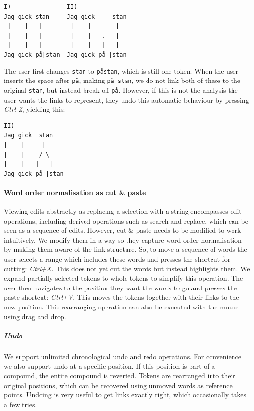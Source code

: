 \documentclass[10pt, a4paper]{article}
\newcommand{\dan}[1]{{\color{Fuchsia}{Dan: #1}}}
\begin{document}
\begin{verbatim}
I)                II)
Jag gick stan     Jag gick     stan
 |    |   |        |    |       |
 |    |   |        |    |   .   |
 |    |   |        |    |   |   |
Jag gick på|stan  Jag gick på |stan
\end{verbatim}
The user first changes \verb!stan! to \verb!påstan!, which is still one token.
When the user inserts the space after \verb!på!, making \verb!på stan!, we do
not link both of these to the original \verb!stan!,
but instead break off \verb!på!.
However, if this is not the analysis the user wants the links to represent,
they undo this automatic behaviour by pressing {\it Ctrl-Z},
yielding this:

\begin{verbatim}
II)
Jag gick  stan
|    |     |
|    |    / \
|    |   |   |
Jag gick på |stan
\end{verbatim}


\paragraph{Word order normalisation as cut \& paste}
Viewing edits abstractly as replacing a selection with a string encompasses
edit operations, including derived operations such as search and replace,
which can be seen as a sequence of edits. However, cut \& paste needs to
be modified to work intuitively. We modify them in a way so they capture
word order normalisation by making them aware of the link structure.
So, to move a sequence of words the user selects a range
which includes these words and presses the shortcut for cutting: {\it Ctrl+X}.
This does not yet cut the words but instead highlights them. We expand partially
selected tokens to whole tokens to simplify this operation. The user then
navigates to the position they want the words to go and presses the paste
shortcut: {\it Ctrl+V}.
This moves the tokens together with their links to the new position.
This rearranging operation can also be executed with the mouse using drag and drop.
\dan{Intend to add image with example showing this step by step}

\subparagraph{Undo} We support unlimited chronological undo and redo operations.
For convenience we also support undo at a specific position. %
If this position is part of a compound, the entire compound is reverted.
Tokens are rearranged into their original positions, which
can be recovered using unmoved words as reference points.
Undoing is very useful to get links exactly right, which occasionally takes a
few tries.
\end{document}
